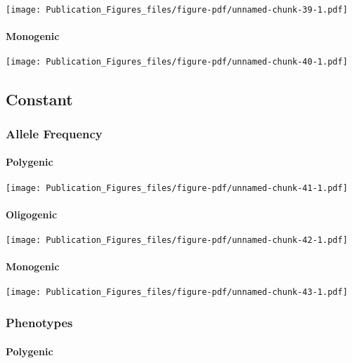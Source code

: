 \documentclass[
  letterpaper,
  DIV=11,
  numbers=noendperiod]{scrartcl}
\begin{document}
\texttt{[image: Publication\_Figures\_files/figure-pdf/unnamed-chunk-39-1.pdf]}

\hypertarget{monogenic-2}{%
\paragraph{Monogenic}\label{monogenic-2}}

\texttt{[image: Publication\_Figures\_files/figure-pdf/unnamed-chunk-40-1.pdf]}

\hypertarget{constant}{%
\subsection{Constant}\label{constant}}

\hypertarget{allele-frequency-2}{%
\subsubsection{Allele Frequency}\label{allele-frequency-2}}

\hypertarget{polygenic-3}{%
\paragraph{Polygenic}\label{polygenic-3}}

\texttt{[image: Publication\_Figures\_files/figure-pdf/unnamed-chunk-41-1.pdf]}

\hypertarget{oligogenic-3}{%
\paragraph{Oligogenic}\label{oligogenic-3}}

\texttt{[image: Publication\_Figures\_files/figure-pdf/unnamed-chunk-42-1.pdf]}

\hypertarget{monogenic-3}{%
\paragraph{Monogenic}\label{monogenic-3}}

\texttt{[image: Publication\_Figures\_files/figure-pdf/unnamed-chunk-43-1.pdf]}

\hypertarget{phenotypes-2}{%
\subsubsection{Phenotypes}\label{phenotypes-2}}

\hypertarget{polygenic-4}{%
\paragraph{Polygenic}\label{polygenic-4}}
\end{document}
